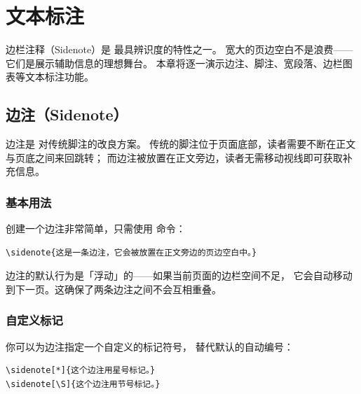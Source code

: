 \setchapterpreamble[u]{\margintoc}
\chapter{文本标注}

边栏注释（Sidenote）是  最具辨识度的特性之一。
宽大的页边空白不是浪费——它们是展示辅助信息的理想舞台。
本章将逐一演示边注、脚注、宽段落、边栏图表等文本标注功能。

\section{边注（Sidenote）}

边注是  对传统脚注的改良方案。
传统的脚注位于页面底部，读者需要不断在正文与页底之间来回跳转；
而边注被放置在正文旁边，读者无需移动视线即可获取补充信息。

\subsection{基本用法}

创建一个边注非常简单，只需使用  命令：

\begin{lstlisting}[style=kaolstplain, caption=基本边注语法]
\sidenote{这是一条边注，它会被放置在正文旁边的页边空白中。}
\end{lstlisting}


边注的默认行为是「浮动」的——如果当前页面的边栏空间不足，
它会自动移动到下一页。这确保了两条边注之间不会互相重叠。

\subsection{自定义标记}

你可以为边注指定一个自定义的标记符号，
替代默认的自动编号：

\begin{lstlisting}[style=kaolstplain, caption=自定义边注标记]
\sidenote[*]{这个边注用星号标记。}
\sidenote[\S]{这个边注用节号标记。}
\end{lstlisting}


